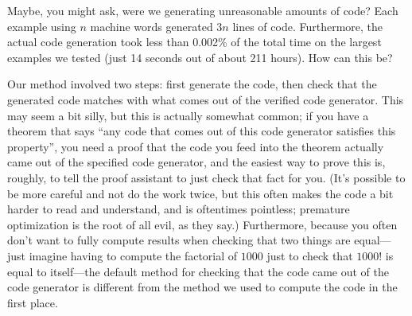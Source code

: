 
Maybe, you might ask, were we generating unreasonable amounts of code?
Each example using $n$ machine words generated $3n$ lines of code.
Furthermore, the actual code generation took less than 0.002\% of the total time on the largest examples we tested (just 14 seconds out of about 211 hours).
How can this be?

Our method involved two steps: first generate the code, then check that the generated code matches with what comes out of the verified code generator.
This may seem a bit silly, but this is actually somewhat common; if you have a theorem that says ``any code that comes out of this code generator satisfies this property'', you need a proof that the code you feed into the theorem actually came out of the specified code generator, and the easiest way to prove this is, roughly, to tell the proof assistant to just check that fact for you.
(It's possible to be more careful and not do the work twice, but this often makes the code a bit harder to read and understand, and is oftentimes pointless; premature optimization is the root of all evil, as they say.)
Furthermore, because you often don't want to fully compute results when checking that two things are equal---just imagine having to compute the factorial of $1000$ just to check that $1000!$ is equal to itself---the default method for checking that the code came out of the code generator is different from the method we used to compute the code in the first place.

